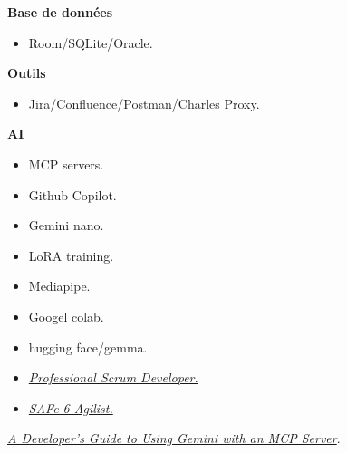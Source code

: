 \documentclass[10pt,a4paper,withhyper]{altacv}
\begin{document}
\begin{paracol}{2}
\textbf{Base de données}

\begin{itemize}
	\item Room/SQLite/Oracle.
\end{itemize}
\divider

\textbf{Outils}

\begin{itemize}
	\item Jira/Confluence/Postman/Charles Proxy.
\end{itemize}
\divider

\textbf{AI}

\begin{itemize}
	\item MCP servers.
	\item Github Copilot.
	\item Gemini nano.
	\item LoRA training.
	\item Mediapipe.
	\item Googel colab.
	\item hugging face/gemma.
\end{itemize}




\divider

\divider




\begin{itemize}
\item \href{https://www.scrum.org/user/418540}{\textit{Professional Scrum Developer.}}
\item \href{https://community.scaledagile.com/apex/PrintAchievement?aid=a0t6T00000O8QGyQAN&aaid=a0rQo00001ie1R1IAI}{\textit{SAFe 6 Agilist.}}
\end{itemize}





\href{https://medium.com/@slimaniiyassine/a-developers-guide-to-using-gemini-with-an-mcp-server-05878c418097}{\textit{A Developer’s Guide to Using Gemini with an MCP Server}}.




\end{paracol}
\end{document}

